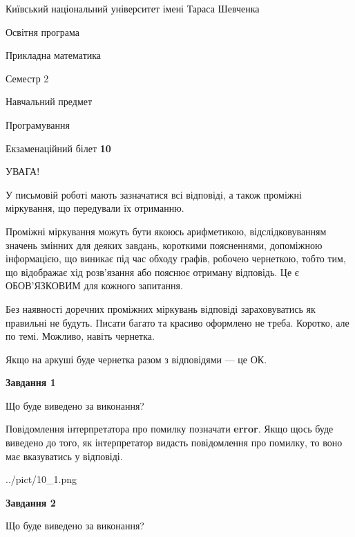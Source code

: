 \documentclass[12pt, ukrainian]{article}
\begin{document}
{{\begin {small}\par
{ \center  Київський національний університет імені Тараса Шевченка \par}
{\parbox {5 cm}{Освітня програма \hfill}{\parbox {7 cm}{Прикладна математика \hfill}}\parbox {6 cm}{\hfill Семестр 2}}\par
{\parbox {5 cm} {Навчальний предмет \hfill}\parbox {7 cm}{Програмування \hfill}\parbox {6cm}{\hfill}\par}\vspace{-7pt} \end{small}}{\center Екзаменаційний білет \No \textbf
{ 10 }\par}}
{
\begin {large}
УВАГА!

У письмовій роботі мають зазначатися всі відповіді, а також проміжні міркування, що передували їх отриманню.

Проміжні міркування можуть бути якоюсь арифметикою, відслідковуванням зна\-чень змінних для деяких завдань,
короткими поясненнями, допоміжною інформацією, що виникає під час обходу графів, робочею чернеткою,
тобто тим, що відображає хід розв’язання або пояснює отриману відповідь.
Це є ОБОВ’ЯЗКОВИМ для кожного запитання.

Без наявності доречних проміжних міркувань відповіді зараховуватись як правиль\-ні не будуть.
Писати багато та красиво оформлено не треба. Коротко, але по темі. Можли\-во, навіть чернетка.

Якщо на аркуші буде чернетка разом з відповідями --- це ОК.

\newpage

{\begin {center}\textbf{Завдання 1}\end {center}}\par
Що буде виведено за виконання?

Повідомлення інтерпретатора про помилку позначати \textbf{error}.
Якщо щось буде виведено до того, як інтерпретатор видасть повідомлення про помилку, 
то воно має вказуватись у відповіді. \par


\begin{center}
	{../pict/10_1.png}
\end{center}
\newpage

{\begin {center}\textbf{Завдання 2}\end {center}}\par
Що буде виведено за виконання?


\end{large}}
\end{document}
